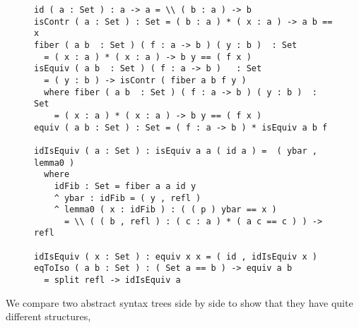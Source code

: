 \begin{figure}[H]
\begin{verbatim}
id ( a : Set ) : a -> a = \\ ( b : a ) -> b
isContr ( a : Set ) : Set = ( b : a ) * ( x : a ) -> a b == x
fiber ( a b  : Set ) ( f : a -> b ) ( y : b )  : Set 
  = ( x : a ) * ( x : a ) -> b y == ( f x )
isEquiv ( a b  : Set ) ( f : a -> b )   : Set 
  = ( y : b ) -> isContr ( fiber a b f y )
  where fiber ( a b  : Set ) ( f : a -> b ) ( y : b )  : Set 
    = ( x : a ) * ( x : a ) -> b y == ( f x )
equiv ( a b : Set ) : Set = ( f : a -> b ) * isEquiv a b f

idIsEquiv ( a : Set ) : isEquiv a a ( id a ) =  ( ybar , lemma0 )
  where
    idFib : Set = fiber a a id y
    ^ ybar : idFib = ( y , refl )
    ^ lemma0 ( x : idFib ) : ( ( p ) ybar == x ) 
      = \\ ( ( b , refl ) : ( c : a ) * ( a c == c ) ) -> refl

idIsEquiv ( x : Set ) : equiv x x = ( id , idIsEquiv x )
eqToIso ( a b : Set ) : ( Set a == b ) -> equiv a b 
  = split refl -> idIsEquiv a
\end{verbatim}
\end{figure}

We compare two abstract syntax trees side by side to show that they have quite different structures,

